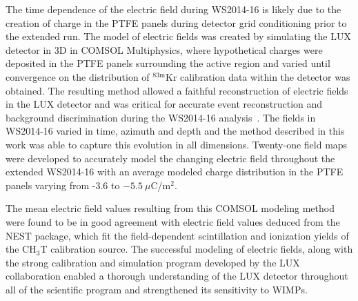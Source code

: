 \documentclass[11pt,a4paper]{article}
\newcommand{\isot}[2]{$^{\textrm{#2}}$#1 }
\newcommand{\krm}{\isot{Kr}{83m}}
\begin{document}
The time dependence of the electric field during WS2014-16 is likely due to the creation of charge in the PTFE panels during detector grid conditioning prior to the extended run. The model of electric fields was created by simulating the LUX detector in 3D in \textsc{COMSOL} Multiphysics, where hypothetical charges were deposited in the PTFE panels surrounding the active region and varied until convergence on the distribution of \krm calibration data within the detector was obtained. The resulting method allowed a faithful reconstruction of electric fields in the LUX detector and was critical for accurate event reconstruction and background discrimination during the WS2014-16 analysis~\cite{Akerib:2016vxi}. The fields in WS2014-16 varied in time, azimuth and depth and the method described in this work was able to capture this evolution in all dimensions. Twenty-one field maps were developed to accurately model the changing electric field throughout the extended WS2014-16 with an average modeled charge distribution in the PTFE panels varying from -3.6 to $-5.5~\mu$C/m$^2$.

The mean electric field values resulting from this \textsc{COMSOL} modeling method were found to be in good agreement with electric field values deduced from the NEST package, which fit the field-dependent scintillation and ionization yields of the CH$_3$T calibration source. The successful modeling of electric fields, along with the strong calibration and simulation program developed by the LUX collaboration enabled a thorough understanding of the LUX detector throughout all of the scientific program and strengthened its sensitivity to WIMPs.
\end{document}
